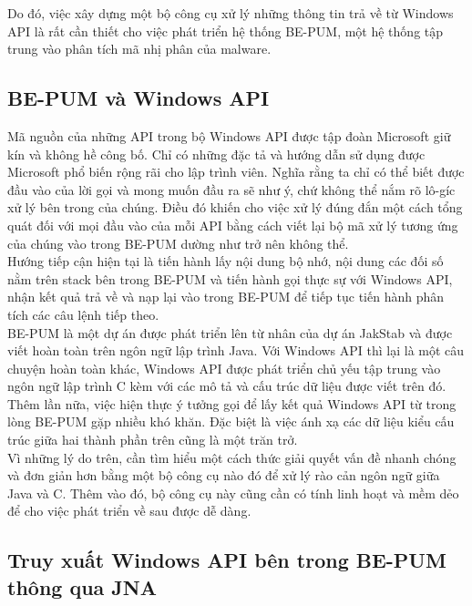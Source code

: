 Do đó, việc xây dựng một bộ công cụ xử lý những thông tin trả về từ Windows API là rất cần thiết cho việc phát triển hệ thống BE-PUM, một hệ thống tập trung vào phân tích mã nhị phân của malware.\\




	\subsection{BE-PUM và Windows API}

Mã nguồn của những API trong bộ Windows API được tập đoàn Microsoft giữ kín và không hề công bố. Chỉ có những đặc tả và hướng dẫn sử dụng được Microsoft phổ biến rộng rãi cho lập trình viên. Nghĩa rằng ta chỉ có thể biết được đầu vào của lời gọi và mong muốn đầu ra sẽ như ý, chứ không thể nắm rõ lô-gíc xử lý bên trong của chúng. Điều đó khiến cho việc xử lý đúng đắn một cách tổng quát đối với mọi đầu vào của mỗi API bằng cách viết lại bộ mã xử lý tương ứng của chúng vào trong BE-PUM dường như trở nên không thể.\\

Hướng tiếp cận hiện tại là tiến hành lấy nội dung bộ nhớ, nội dung các đối số nằm trên stack bên trong BE-PUM và tiến hành gọi thực sự với Windows API, nhận kết quả trả về và nạp lại vào trong BE-PUM để tiếp tục tiến hành phân tích các câu lệnh tiếp theo.\\

BE-PUM là một dự án được phát triển lên từ nhân của dự án JakStab và được viết hoàn toàn trên ngôn ngữ lập trình Java. Với Windows API thì lại là một câu chuyện hoàn toàn khác, Windows API được phát triển chủ yếu tập trung vào ngôn ngữ lập trình C kèm với các mô tả và cấu trúc dữ liệu được viết trên đó. Thêm lần nữa, việc hiện thực ý tưởng gọi để lấy kết quả Windows API từ trong lòng BE-PUM gặp nhiều khó khăn. Đặc biệt là việc ánh xạ các dữ liệu kiểu cấu trúc giữa hai thành phần trên cũng là một trăn trở.\\

Vì những lý do trên, cần tìm hiểu một cách thức giải quyết vấn đề nhanh chóng và đơn giản hơn bằng một bộ công cụ nào đó để xử lý rào cản ngôn ngữ giữa Java và C. Thêm vào đó, bộ công cụ này cũng cần có tính linh hoạt và mềm dẻo để cho việc phát triển về sau được dễ dàng.\\




	\subsection{Truy xuất Windows API bên trong BE-PUM thông qua JNA}

